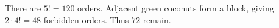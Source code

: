There are $5!=120$ orders. Adjacent green coconuts form a block, giving $2\cdot4!=48$ forbidden orders. Thus $\boxed{72}$ remain.
